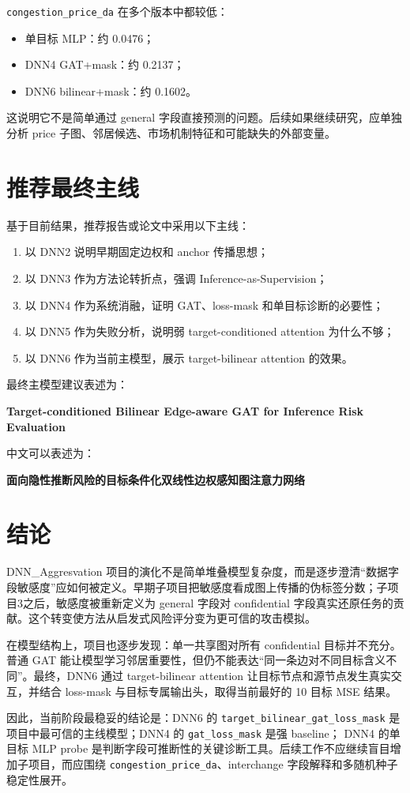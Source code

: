 \documentclass[UTF8]{ctexart}
\begin{document}
\texttt{congestion\_price\_da} 在多个版本中都较低：
\begin{itemize}
    \item 单目标 MLP：约 0.0476；
    \item DNN4 GAT+mask：约 0.2137；
    \item DNN6 bilinear+mask：约 0.1602。
\end{itemize}
这说明它不是简单通过 general 字段直接预测的问题。后续如果继续研究，应单独分析 price 子图、邻居候选、市场机制特征和可能缺失的外部变量。

\section{推荐最终主线}

基于目前结果，推荐报告或论文中采用以下主线：

\begin{enumerate}
    \item 以 DNN2 说明早期固定边权和 anchor 传播思想；
    \item 以 DNN3 作为方法论转折点，强调 Inference-as-Supervision；
    \item 以 DNN4 作为系统消融，证明 GAT、loss-mask 和单目标诊断的必要性；
    \item 以 DNN5 作为失败分析，说明弱 target-conditioned attention 为什么不够；
    \item 以 DNN6 作为当前主模型，展示 target-bilinear attention 的效果。
\end{enumerate}

最终主模型建议表述为：

\begin{center}
\textbf{Target-conditioned Bilinear Edge-aware GAT for Inference Risk Evaluation}
\end{center}

中文可以表述为：

\begin{center}
\textbf{面向隐性推断风险的目标条件化双线性边权感知图注意力网络}
\end{center}

\section{结论}

DNN\_Aggresvation 项目的演化不是简单堆叠模型复杂度，而是逐步澄清“数据字段敏感度”应如何被定义。早期子项目把敏感度看成图上传播的伪标签分数；子项目3之后，敏感度被重新定义为 general 字段对 confidential 字段真实还原任务的贡献。这个转变使方法从启发式风险评分变为更可信的攻击模拟。

在模型结构上，项目也逐步发现：单一共享图对所有 confidential 目标并不充分。普通 GAT 能让模型学习邻居重要性，但仍不能表达“同一条边对不同目标含义不同”。最终，DNN6 通过 target-bilinear attention 让目标节点和源节点发生真实交互，并结合 loss-mask 与目标专属输出头，取得当前最好的 10 目标 MSE 结果。

因此，当前阶段最稳妥的结论是：DNN6 的 \texttt{target\_bilinear\_gat\_loss\_mask}
是项目中最可信的主线模型；DNN4 的 \texttt{gat\_loss\_mask} 是强 baseline；
DNN4 的单目标 MLP probe 是判断字段可推断性的关键诊断工具。后续工作不应继续盲目增加子项目，而应围绕 \texttt{congestion\_price\_da}、interchange 字段解释和多随机种子稳定性展开。
\end{document}
